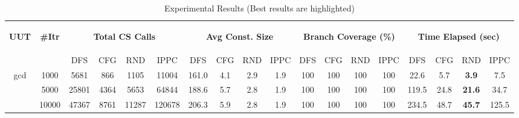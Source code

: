 \documentclass[EPiCempty]{easychair}
\begin{document}
\begin{table}
\setlength{\tabcolsep}{3pt}
\centering
\caption{Experimental Results (Best results are highlighted)}
\begin{scriptsize}
\begin{tabular}{|c|c|cccc|cccc|cccc|cccc|}
\hline
\multirow{2}{*}{\begin{scriptsize}\textbf{UUT}\end{scriptsize}}        & \multirow{2}{*}{\begin{scriptsize}\textbf{\#Itr}\end{scriptsize}} & \multicolumn{4}{c|}{\begin{scriptsize}\textbf{Total CS Calls}\end{scriptsize}} & \multicolumn{4}{c|}{\begin{scriptsize}\textbf{Avg Const. Size}\end{scriptsize}} & \multicolumn{4}{c|}{\begin{scriptsize}\textbf{Branch Coverage (\%)}\end{scriptsize}} & \multicolumn{4}{c|}{\begin{scriptsize}\textbf{Time Elapsed (sec)}\end{scriptsize}} \\
                            &                         & DFS    & CFG    & RND    & IPPC    & DFS     & CFG    & RND    & IPPC    & DFS     & CFG    & RND    & IPPC    & DFS      & CFG      & RND     & IPPC    \\
\hline
\multirow{3}{*}{gcd}        &             1000            &   5681     &   866     &   1105     &   11004      &   161.0      &   4.1     &   2.9     &   1.9      &   100      &   100     &   100     &    100     &   22.6       &    5.7      &   \textbf{3.9}      &    7.5      \\
                            &          5000               &    25801    &    4364    &   5653     &   64844      &   188.6      &   5.7     &   2.8     &   1.9      &    100     &   100     &   100     &    100    &    119.5      &    24.8      &   \textbf{21.6}      &   34.7    \\
                            &         10000                &   47367     &    8761    &   11287     &    120678     &    206.3     &   5.9     &   2.8     &    1.9      &    100     &   100     &   100     &   100      &   234.5       &    48.7      &   \textbf{45.7}      &     125.5     \\

\end{tabular}
\end{scriptsize}
\end{table}
\end{document}
